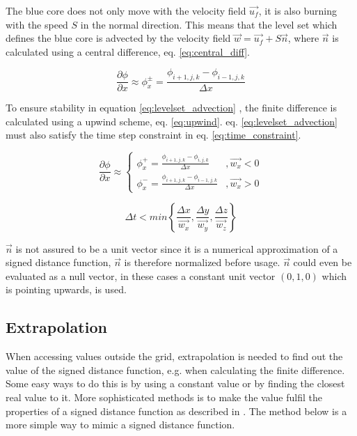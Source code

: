 The blue core does not only move with the velocity field $\vec{u_f}$, it is also burning with the speed $S$ in the normal direction. This means that the level set which defines the blue core is advected by the velocity field $\vec{w} = \vec{u_f} + S \vec{n}$, where $\vec{n}$ is calculated using a central difference, eq. \ref{eq:central_diff}.

\begin{equation}
\label{eq:central_diff}
\frac{\partial \phi}{\partial x} \approx \phi_x^\pm = \frac{\phi_{i+1,j,k} - \phi_{i-1,j,k}}{\Delta x }
\end{equation}  

To ensure stability in equation \ref{eq:levelset_advection} \cite{CFL}, the finite difference is calculated using a upwind scheme, eq. \ref{eq:upwind}. eq. \ref{eq:levelset_advection} must also satisfy the time step constraint in eq. \ref{eq:time_constraint}.

\begin{equation}
\label{eq:upwind}
\frac{\partial \phi}{\partial x} \approx \left\{\begin{matrix}
 \phi_x^+ = \frac{\phi_{i+1,j,k} - \phi_{i,j,k}}{\Delta x } & ,\vec{w_x} < 0
\\ 
 \phi_x^- = \frac{\phi_{i+1,j,k} - \phi_{i-1,j,k}}{\Delta x } & ,\vec{w_x} > 0 
\end{matrix}\right.
\end{equation}  

\begin{equation}
\label{eq:time_constraint}
\Delta t < min \left \{ \frac{\Delta x}{ \vec{w_x} }, \frac{\Delta y}{ \vec{w_y} }, \frac{\Delta z}{ \vec{w_z} } \right \}
\end{equation} 

$\vec{n}$ is not assured to be a unit vector since it is a numerical approximation of a signed distance function, $\vec{n}$ is therefore normalized before usage. $\vec{n}$ could even be evaluated as a null vector, in these cases a constant unit vector $(0, 1, 0)$ which is pointing upwards, is used.

\subsection{Extrapolation}

When accessing values outside the grid, extrapolation is needed to find out the value of the signed distance function, e.g. when calculating the finite difference. Some easy ways to do this is by using a constant value or by finding the closest real value to it. More sophisticated methods is to make the value fulfil the properties of a signed distance function as described in \cite{bridson}. The method below is a more simple way to mimic a signed distance function. 

